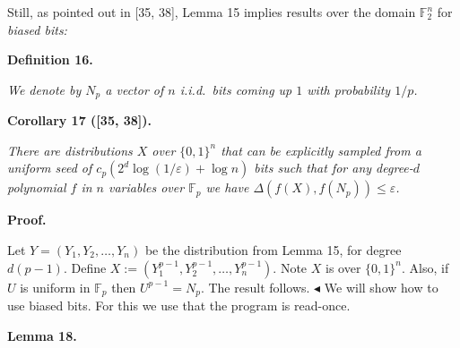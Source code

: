 Still, as pointed out in [35, 38], Lemma 15
implies results over the domain $\mathbb{F}_{2}^{n}$ for \emph{biased bits:}\par





\par\medskip\noindent\textbf{
\textbf{Definition 16}\textbf{.}
}\par



\emph{We denote by $N_{p}$ a vector of $n$ i.i.d. bits
coming up $1$ with probability $1/p$.}\par







\par\medskip\noindent\textbf{
\textbf{Corollary 17}\textbf{ }([35, 38])\textbf{.}
}\par



\emph{There are distributions $X$ over $\{0,1\}^{n}$ that can be explicitly sampled
from a uniform seed of $c_{p}(2^{d}\log(1/\varepsilon)+\log n)$ bits such that for
any degree-$d$ polynomial $f$ in $n$ variables over $\mathbb{F}_{p}$
we have $\Delta(f(X),f(N_{p}))\leq\varepsilon$.}\par







\par\medskip\noindent\textbf{Proof.}\par




Let $Y=(Y_{1},Y_{2},\ldots,Y_{n})$ be the distribution from Lemma 15,
for degree $d(p-1)$. Define $X:=(Y_{1}^{p-1},Y_{2}^{p-1},\ldots,Y_{n}^{p-1})$.
Note $X$ is over $\{0,1\}^{n}$. Also, if $U$ is uniform in $\mathbb{F}_{p}$
then $U^{p-1}=N_{p}$. The result follows.
$\blacktriangleleft$
We will show how to use biased bits. For this we use that the program
is read-once.\par





\par\medskip\noindent\textbf{
\textbf{Lemma 18}\textbf{.}
}\par



